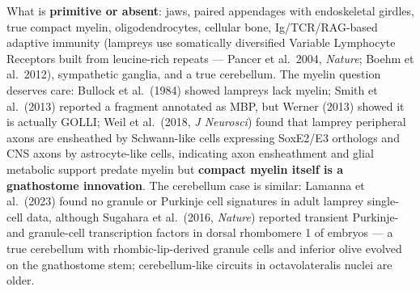 What is \textbf{primitive or absent}: jaws, paired appendages with endoskeletal girdles, true compact myelin, oligodendrocytes, cellular bone, Ig/TCR/RAG-based adaptive immunity (lampreys use somatically diversified Variable Lymphocyte Receptors built from leucine-rich repeats --- Pancer et al.~2004, \emph{Nature}; Boehm et al.~2012), sympathetic ganglia, and a true cerebellum. The myelin question deserves care: Bullock et al.~(1984) showed lampreys lack myelin; Smith et al.~(2013) reported a fragment annotated as MBP, but Werner (2013) showed it is actually GOLLI; Weil et al.~(2018, \emph{J Neurosci}) found that lamprey peripheral axons are ensheathed by Schwann-like cells expressing SoxE2/E3 orthologs and CNS axons by astrocyte-like cells, indicating axon ensheathment and glial metabolic support predate myelin but \textbf{compact myelin itself is a gnathostome innovation}. The cerebellum case is similar: Lamanna et al.~(2023) found no granule or Purkinje cell signatures in adult lamprey single-cell data, although Sugahara et al.~(2016, \emph{Nature}) reported transient Purkinje- and granule-cell transcription factors in dorsal rhombomere 1 of embryos --- a true cerebellum with rhombic-lip-derived granule cells and inferior olive evolved on the gnathostome stem; cerebellum-like circuits in octavolateralis nuclei are older.

